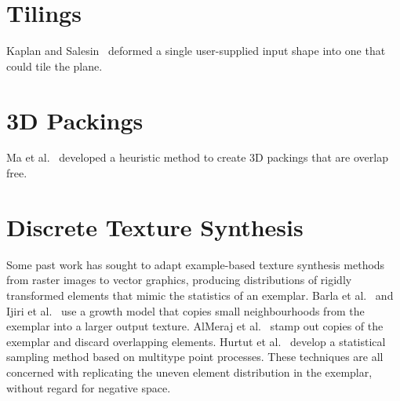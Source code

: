 \section{Tilings}
Kaplan and Salesin~\cite{Kaplan2000} deformed a single user-supplied 
input shape into one that could tile the plane.

\section{3D Packings}


Ma et al.~\cite{Ma2018} developed a heuristic method
to create 3D packings that are overlap free.

\section{Discrete Texture Synthesis}
Some past work has sought to adapt example-based texture synthesis methods
from raster images to vector graphics, producing distributions of rigidly transformed elements
that mimic the statistics of an exemplar.  Barla et al.~\cite{Barla2006} and
Ijiri et al.~\cite{Ijiri2008} use a growth model that copies small neighbourhoods
from the exemplar into a larger output texture.  AlMeraj et al.~\cite{AlMeraj2013}
stamp out copies of the exemplar and discard overlapping elements.
Hurtut et al.~\cite{Hurtut2009} develop a statistical sampling method based
on multitype point processes.  
These techniques are all concerned with replicating
the uneven element distribution in the exemplar, without regard for negative space.

